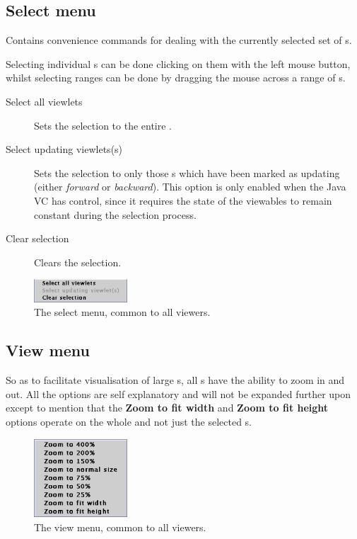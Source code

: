 \subsection{Select menu}
Contains convenience commands for dealing with the currently selected
set of \viewlet{}s.

Selecting individual \viewlet{}s can be done clicking on them with the left mouse button, whilst selecting ranges can be done by dragging the mouse across a range of \viewlet{}s.

\begin{description}
\item[Select all viewlets] Sets the selection to the entire \viewable{}.
\item[Select updating viewlets(s)] Sets the selection to only those
\viewlet{}s which have been marked as updating (either \emph{forward}
or \emph{backward}).  This option is only enabled when the Java VC has
control, since it requires the state of the viewables to remain
constant during the selection process.
\item[Clear selection] Clears the selection.
\end{description}


\begin{figure}[htp]
\centering
\includegraphics[width=3.5cm]{vcselectmenu}
\caption{The select menu, common to all viewers.}
\label{fig:selectmenu}
\end{figure}

\subsection{View menu}

So as to facilitate visualisation of large \viewable{}s, all \viewer{}s
have the ability to zoom in and out.  All the options are self
explanatory and will not be expanded further upon except to mention
that the \textbf{Zoom to fit width} and \textbf{Zoom to fit height}
options operate on the whole \viewer{} and not just the selected
\viewlet{}s.

\begin{figure}[htp]
\centering
\includegraphics[width=3.5cm]{vcviewmenu}
\caption{The view menu, common to all viewers.}
\label{fig:viewmenu}
\end{figure}

